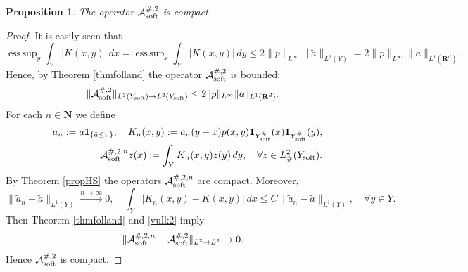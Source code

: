 \documentclass[11pt]{article}
\newcommand\soft{{\rm soft}}
\def\AA{\mathcal{A}}
\newcommand\N{\mathbf{N}}
\newcommand\esssup{\mathop{\operatorname{ess\,sup}}}
\newtheorem{proposition}[theorem]{Proposition}
\theoremstyle{remark}
\begin{document}
 \begin{proposition}%
The operator $\AA_\soft^{\#,2}$ is compact. 	
 \end{proposition} 	
 \begin{proof}
 	It is easily seen that
 	$$\esssup_y\int_Y |K(x,y)|\,dx = \esssup_x\int_Y |K(x,y)|\,dy\leq 2\|p\|_{L^\infty}\|\tilde{a}\|_{L^1(Y)}=2\|p\|_{L^\infty}\|a\|_{L^1(\mathbf{R}^d)}. $$
 	Hence, by Theorem \ref{thmfolland} the operator $\AA_\soft^{\#,2}$ is bounded:
 	$$\|\AA_\soft^{\#,2}\|_{L^2(Y_\soft) \to L^2(Y_\soft)} \leq  2\|p\|_{L^\infty}\|a\|_{L^1(\mathbf{R}^d)}. $$
 	For each $n\in \N$ we define
 	\begin{eqnarray*}
 	& & \tilde{a}_n:=\tilde{a}\mathbf{1}_{\{\tilde{a}\leq n\}},\quad K_n(x,y):=\tilde{a}_n(y-x) p(x,y)\mathbf{1}_{Y_\soft^\#}(x)\mathbf{1}_{Y_\soft^\#}(y),\\ & &\hspace{+3ex} \AA_\soft^{\#,2,n}z(x):=\int_Y K_n(x,y)z(y)\,dy,\quad \forall z \in L^2_\#(Y_\soft).
 	 \end{eqnarray*}
 	 By  Theorem \ref{propHS} the operators $\AA_\soft^{\#,2,n}$ are compact.  Moreover,
 	\begin{equation} \label{vulk2}
 	\|\tilde{a}_n-\tilde{a}\|_{L^1 (Y)} \xrightarrow{n \to \infty}0, \quad \int_Y|K_n(x,y) -K (x,y)|\,dx\leq C\|\tilde{a}_n-\tilde{a}\|_{L^1(Y)},\quad \forall y \in Y.
 	\end{equation}
 	Then Theorem \ref{thmfolland} and \eqref{vulk2} imply
 	$$\|\AA_\soft^{\#,2,n}-\AA_\soft^{\#,2}\|_{L^2\to L^2}\to 0.$$
 	Hence $\AA_\soft^{\#,2}$ is   compact.
 \end{proof} 	
\end{document}

